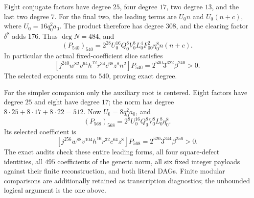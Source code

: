 Eight conjugate factors have degree $25$, four degree $17$, two degree
$13$, and the last two degree $7$. For the final two, the leading terms
are $U_0n$ and $U_0(n+c)$, where $U_0=16q_0^2a_0$.
The product therefore has degree $308$, and the clearing factor
$\delta^8$ adds $176$. Thus $\deg N=484$, and
\[
 (P_{540})_{540}
 =2^{28}U_0^{16}Q_0^8V_0^8L_0^4F_{00}^2\eta_0^8 n(n+c).
\]
In particular the actual fixed-coefficient slice satisfies
\[
 [j^{240}w^{82}v^{94}h^{12}r^{34}c^{68}z^8n^2]P_{540}
   =2^{530}3^{322}\beta^{240}>0.
\]
The selected exponents sum to $540$, proving exact degree.

For the simpler companion only the auxiliary root is centered. Eight
factors have degree $25$ and eight have degree $17$; the norm has degree
$8\cdot25+8\cdot17+8\cdot22=512$. Now $U_0=8q_0^2a_0$, and
\[
 (P_{568})_{568}=2^8U_0^{16}Q_0^8V_0^8L_0^8\eta_0^8.
\]
Its selected coefficient is
\[
 [j^{256}w^{88}v^{104}h^{16}r^{32}c^{64}z^8]P_{568}
 =2^{520}3^{344}\beta^{256}>0.
\]
The exact audits check these entire leading forms, all four square-defect
identities, all $495$ coefficients of the generic norm, all six fixed
integer payloads against their finite reconstruction, and both literal
DAGs. Finite modular comparisons are additionally retained as transcription
diagnostics; the unbounded logical argument is the one above.
